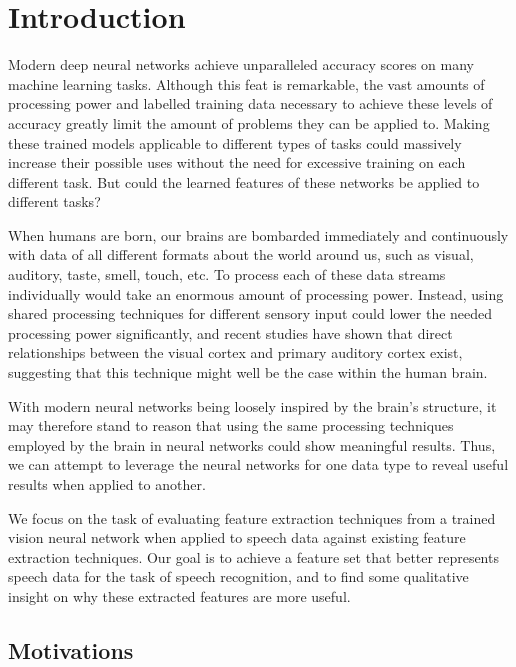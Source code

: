 \graphicspath{{introduction/fig/}}

\chapter{Introduction}
\label{chap:introduction}

Modern deep neural networks achieve unparalleled accuracy scores on many machine learning tasks.
Although this feat is remarkable, the vast amounts of processing power and labelled training data necessary to achieve these levels of accuracy greatly limit the amount of problems they can be applied to.
Making these trained models applicable to different types of tasks could massively increase their possible uses without the need for excessive training on each different task.
But could the learned features of these networks be applied to different tasks?

When humans are born, our brains are bombarded immediately and continuously with data of all different formats about the world around us, such as visual, auditory, taste, smell, touch, etc.
To process each of these data streams individually would take an enormous amount of processing power.
Instead, using shared processing techniques for different sensory input could lower the needed processing power significantly, and recent studies have shown that direct relationships between the visual cortex and primary auditory cortex exist\cite{doi:10.1002/hbm.20560}, suggesting that this technique might well be the case within the human brain.

With modern neural networks being loosely inspired by the brain's structure, it may therefore stand to reason that using the same processing techniques employed by the brain in neural networks could show meaningful results.
Thus, we can attempt to leverage the neural networks for one data type to reveal useful results when applied to another. 

We focus on the task of evaluating feature extraction techniques from a trained vision neural network when applied to speech data against existing feature extraction techniques.
Our goal is to achieve a feature set that better represents speech data for the task of speech recognition, and to find some qualitative insight on why these extracted features are more useful. 

\section{Motivations}

